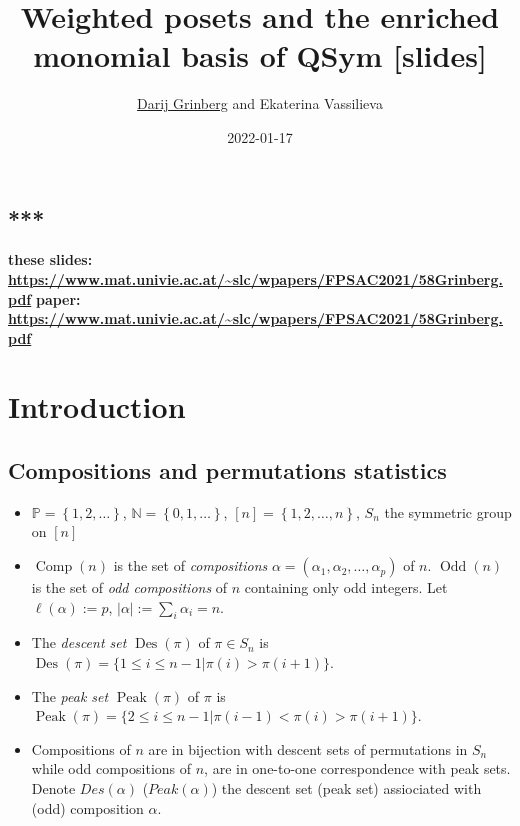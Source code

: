 \documentclass[numbers=enddot,12pt,final,onecolumn,notitlepage]{scrartcl}%
\newcommand{\al}{\alpha}
\newcommand{\NN}{\mathbb{N}} %
\newcommand{\PP}{\mathbb{P}} %
\newcommand{\Des}{\operatorname{Des}}
\newcommand{\Odd}{\operatorname{Odd}}
\newcommand{\Comp}{\operatorname{Comp}}
\newcommand{\Peak}{\operatorname{Peak}}
\newcommand{\defn}[1]{{\color{darkred}\emph{#1}}}
\newcommand{\0}{\phantom{c}}
\let\sumnonlimits\sum
\renewcommand{\sum}{\sumnonlimits\limits}
\begin{document}
\title{Weighted posets and the enriched monomial basis of QSym [slides]}
\author{\href{http://www.cip.ifi.lmu.de/~grinberg/}{Darij Grinberg} and Ekaterina Vassilieva}
\date{2022-01-17}
\maketitle

\subsection*{***}

\textbf{these slides: \color{red}
\url{https://www.mat.univie.ac.at/~slc/wpapers/FPSAC2021/58Grinberg.pdf}}%
\newline\textbf{paper: \color{red}
\url{https://www.mat.univie.ac.at/~slc/wpapers/FPSAC2021/58Grinberg.pdf}}%
\newline

\section{Introduction}


\subsection{Compositions and permutations statistics}

\begin{itemize}
\item $\PP =\left\{1,2,\dots\right\}$, $\NN = \left\{0,1,\ldots\right\}$, $[n] = \left\{1,2,\dots, n\right\}$, $S_n$ the symmetric group on $[n]$

\item \defn{$\Comp(n)$} is the set of \defn{compositions} $\al = (\al_1, \al_2, \dots, \al_p)$ of $n$. \defn{$\Odd(n)$} is the set of \defn{odd compositions} of $n$ containing only odd integers.  Let $\ell(\al) := p$, $|\al| := \sum_i \al_i = n$.

\item The \defn{descent set} $\Des(\pi)$ of $\pi \in S_n$ is 
$\Des(\pi) = \{1\leq i\leq n-1| \pi(i)>\pi(i+1)\}.$


\item The \defn{peak set} $\Peak(\pi)$ of $\pi$ is $
\Peak(\pi) = \{2\leq i\leq n-1| \pi(i-1)<\pi(i)>\pi(i+1)\}.$

\item Compositions of $n$ are in bijection with descent sets of permutations in $S_n$ while odd compositions of $n$, are in one-to-one correspondence with peak sets. Denote \defn{$Des(\al)$} (\defn{$Peak(\al)$}) the descent set (peak set) assiociated with  (odd) composition $\al$.

\end{itemize}
\end{document}

